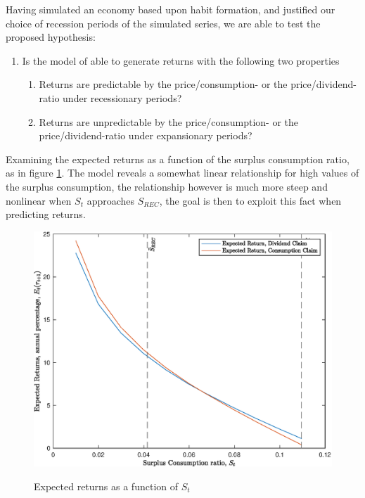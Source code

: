 Having simulated an economy based upon habit formation, and justified our choice of recession periods of the simulated series, we are able to test the proposed hypothesis:
\begin{enumerate}
    \item Is the model of \citet{Campbell1999} able to generate returns with the following two properties
    \begin{enumerate}
        \item Returns are predictable by the price/consumption- or the price/dividend-ratio under recessionary periods?
        \item Returns are unpredictable by the price/consumption- or the price/dividend-ratio under expansionary periods?
    \end{enumerate}
\end{enumerate}
Examining the expected returns as a function of the surplus consumption ratio, as in figure \ref{fig:ErPCPD}. The model reveals a somewhat linear relationship for high values of the surplus consumption, the relationship however is much more steep and nonlinear when $S_t$ approaches ${S}_{REC}$, the goal is then to exploit this fact when predicting returns.

\begin{figure}[H]
    \centering
    \caption{Expected returns as a function of $S_t$}
    \includegraphics{Figures/ErPCPD.eps}
    \label{fig:ErPCPD}
\end{figure}

